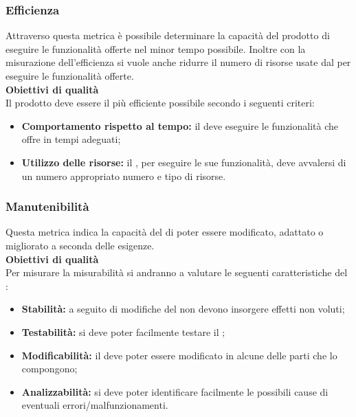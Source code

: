 \subsubsection{Efficienza}
Attraverso questa metrica è possibile determinare la capacità del prodotto di eseguire le funzionalità offerte nel minor tempo possibile.
Inoltre con la misurazione dell'efficienza si vuole anche ridurre il numero di risorse usate dal  per eseguire le funzionalità offerte.\\[0.4cm]
\textbf{Obiettivi di qualità}\\[0.4cm]
Il prodotto deve essere il più efficiente possibile secondo i seguenti criteri:
\begin{itemize}
	\item \textbf{Comportamento rispetto al tempo:} il  deve eseguire le funzionalità che offre in tempi adeguati;
	\item \textbf{Utilizzo delle risorse:} il , per eseguire le sue funzionalità, deve avvalersi di un numero appropriato numero e tipo di risorse.
\end{itemize}

\subsubsection{Manutenibilità}
Questa metrica indica la capacità del  di poter essere modificato, adattato o migliorato a seconda delle esigenze.\\[0.4cm]
\textbf{Obiettivi di qualità}\\[0.4cm]
Per misurare la misurabilità si andranno a valutare le seguenti caratteristiche del :
\begin{itemize}
	\item \textbf{Stabilità:} a seguito di modifiche del  non devono insorgere effetti non voluti;
	\item \textbf{Testabilità:} si deve poter facilmente testare il ;
	\item \textbf{Modificabilità:} il  deve poter essere modificato in alcune delle parti che lo compongono;
	\item \textbf{Analizzabilità:} si deve poter identificare facilmente le possibili cause di eventuali errori/malfunzionamenti.
\end{itemize}

